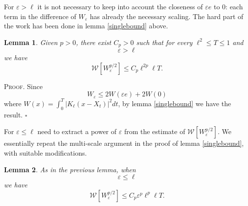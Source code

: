 \documentclass[a4paper,12pt]{article}
\newtheorem{lemma}{Lemma}
\begin{document}
For $\varepsilon>\ell$ it is not necessary to keep into account the closeness
of $\varepsilon e$ to $0$: each term in the difference of $W_{\varepsilon}$
has already the necessary scaling. The hard part of the work has been done in
lemma \ref{singlebound} above.

\begin{lemma}
Given $p>0$, there exist $C_{p}>0$ such that for every $\ell^{2}\leq T\leq1$
and
\[
\varepsilon>\ell
\]
we have
\[
\mathcal{W}\left[  W_{\varepsilon}^{p/2}\right]  \leq C_{p}\ell^{2p}\ell T.
\]
\end{lemma}

\textsc{Proof.}\hspace{0.3cm} Since
\[
W_{\varepsilon}\leq2W(\varepsilon e)+2W(0)
\]
where $W(x)=\int_{0}^{T}\left|  K_{\ell}(x-X_{t})\right|  ^{2}dt$, by lemma
\ref{singlebound} we have the result. \hfill$\square$

For $\varepsilon\leq\ell$ need to extract a power of $\varepsilon$ from the
estimate of $\mathcal{W}\left[  W_{\varepsilon}^{p/2}\right]  $. We
essentially repeat the multi-scale argument in the proof of lemma
\ref{singlebound}, with suitable modifications.

\begin{lemma}
As in the previous lemma, when
\[
\varepsilon\leq\ell
\]
we have
\[
\mathcal{W}\left[  W_{\varepsilon}^{p/2}\right]  \leq C_{p}\varepsilon^{p}%
\ell^{p}\ell T.
\]
\end{lemma}
\end{document}
